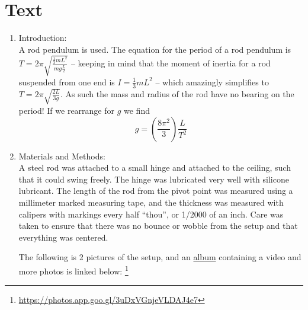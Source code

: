 \documentclass[12pt]{article}
\begin{document}
\section{Text}
    \begin{enumerate}[label=(\alph*)]
        \item Introduction:\\
        A rod pendulum is used. The equation for the period of a rod pendulum is\\ $T = 2\pi\sqrt{\frac{\frac{1}{3}mL^2}{mg\frac{L}{2}}}$ -- keeping in mind that the moment of inertia for a rod suspended from one end is $I=\frac{1}{3}mL^2$ -- which amazingly simplifies to $T=2\pi \sqrt{\frac{2L}{3g}}$. As such the mass and radius of the rod have no bearing on the period! If we rearrange for $g$ we find \[
            g = \left(\frac{8\pi^2}{3}\right) \frac{L}{T^2}    
        \]
        \item Materials and Methods:\\
        A steel rod was attached to a small hinge and attached to the ceiling, such that it could swing freely. The hinge was lubricated very well with silicone lubricant. The length of the rod from the pivot point was measured using a millimeter marked measuring tape, and the thickness was measured with calipers with markings every half ``thou'', or 1/2000 of an inch. Care was taken to ensure that there was no bounce or wobble from the setup and that everything was centered.

        The following is 2 pictures of the setup, and an \href{https://photos.app.goo.gl/3uDxVGnjeVLDAJ4e7}{album} containing a video and more photos is linked below: \footnote{\url{https://photos.app.goo.gl/3uDxVGnjeVLDAJ4e7}}\\


\end{enumerate}
\end{document}

